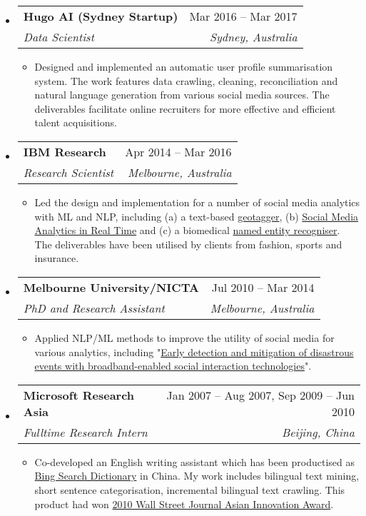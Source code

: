 \documentclass[letterpaper,12pt]{article}[leftmargin=*]
\makeatletter
\def \entryspacing {-0pt}
\newcommand{\resumeEntryStart}{\begin{itemize}[leftmargin=2.5mm]}
\newcommand{\resumeEntryEnd}{\end{itemize}\vspace{\entryspacing}}
\newcommand{\resumeItemListStart}{\begin{itemize}[leftmargin=4.5mm]}
\newcommand{\resumeItemListEnd}{\end{itemize}}
\newcommand{\resumeItem}[1]{
  \item\small{
    {#1 \vspace{-2pt}}
  }
}
\newcommand{\resumeEntryTSDL}[4]{
  \vspace{-1pt}\item[]
    \begin{tabularx}{0.97\textwidth}{X@{\hspace{60pt}}r}
      \textbf{\color{primary}#1} & {\firabook\color{accent}\small#2} \\
      \textit{\color{accent}\small#3} & \textit{\color{accent}\small#4} \\
    \end{tabularx}\vspace{-6pt}
}
\makeatother
\begin{document}
  \resumeEntryStart
    \resumeEntryTSDL
      {Hugo AI (Sydney Startup)}{Mar 2016 -- Mar 2017}
      {Data Scientist}{Sydney, Australia}
    \resumeItemListStart
        \resumeItem {Designed and implemented an automatic user profile summarisation system. The work features data crawling, cleaning, reconciliation and natural language generation from various social media sources. The deliverables facilitate online recruiters for more effective and efficient talent acquisitions.}
    \resumeItemListEnd
  \resumeEntryEnd

  \resumeEntryStart
    \resumeEntryTSDL
      {IBM Research}{Apr 2014 -- Mar 2016}
      {Research Scientist}{Melbourne, Australia}
    \resumeItemListStart
      \resumeItem {Led the design and implementation for a number of social media analytics with ML and NLP, including (a) a text-based \href{http://researcher.watson.ibm.com/researcher/view_group.php?id=6349}{geotagger}, (b) \href{http://researcher.watson.ibm.com/researcher/view_group.php?id=6350}{Social Media Analytics in Real Time} and (c) a biomedical \href{http://researcher.watson.ibm.com/researcher/view_group_pubs.php?grp=5727}{named entity recogniser}. The deliverables have been utilised by clients from fashion, sports and insurance.}
    \resumeItemListEnd
  \resumeEntryEnd

  \resumeEntryStart
    \resumeEntryTSDL
      {Melbourne University/NICTA}{Jul 2010 -- Mar 2014}
      {PhD and Research Assistant}{Melbourne, Australia}
    \resumeItemListStart
      \resumeItem {Applied NLP/ML methods to improve the utility of social media for various analytics, including "\href{http://research.unimelb.edu.au/__data/assets/pdf_file/0006/1891914/IBES-2012-Annual-Report.pdf}{Early detection and mitigation of disastrous events with broadband-enabled social interaction technologies}".}
    \resumeItemListEnd
  \resumeEntryEnd

  \resumeEntryStart
    \resumeEntryTSDL
      {Microsoft Research Asia}{Jan 2007 -- Aug 2007, Sep 2009 -- Jun 2010}
      {Fulltime Research Intern}{Beijing, China}
    \resumeItemListStart
      \resumeItem {Co-developed an English writing assistant which has been productised as \href{https://www.bing.com/dict?FORM=Z9LH3}{Bing Search Dictionary} in China. My work includes bilingual text mining, short sentence categorisation, incremental bilingual text crawling. This product had won \href{https://www.wsj.com/articles/SB10001424052748703545604575406771145298614}{2010 Wall Street Journal Asian Innovation Award}.}
    \resumeItemListEnd
  \resumeEntryEnd
\end{document}
